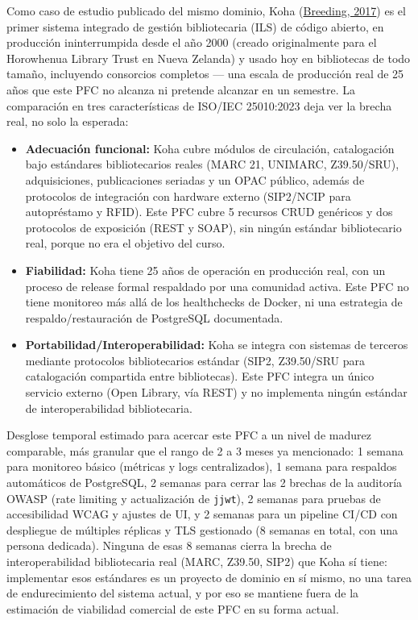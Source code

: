 \documentclass[12pt,a4paper]{article}
\begin{document}
Como caso de estudio publicado del mismo dominio, Koha (\hyperlink{ref:breeding}{Breeding, 2017}) es el
primer sistema integrado de gestión bibliotecaria (ILS) de código abierto, en producción
ininterrumpida desde el año 2000 (creado originalmente para el Horowhenua Library Trust
en Nueva Zelanda) y usado hoy en bibliotecas de todo tamaño, incluyendo consorcios
completos — una escala de producción real de 25 años que este PFC no alcanza ni pretende
alcanzar en un semestre. La comparación en tres características de ISO/IEC 25010:2023
deja ver la brecha real, no solo la esperada:

\begin{itemize}[itemsep=2pt]
  \item \textbf{Adecuación funcional:} Koha cubre módulos de circulación, catalogación
  bajo estándares bibliotecarios reales (MARC 21, UNIMARC, Z39.50/SRU), adquisiciones,
  publicaciones seriadas y un OPAC público, además de protocolos de integración con
  hardware externo (SIP2/NCIP para autopréstamo y RFID). Este PFC cubre 5 recursos CRUD
  genéricos y dos protocolos de exposición (REST y SOAP), sin ningún estándar
  bibliotecario real, porque no era el objetivo del curso.
  \item \textbf{Fiabilidad:} Koha tiene 25 años de operación en producción real, con un
  proceso de release formal respaldado por una comunidad activa. Este PFC no tiene
  monitoreo más allá de los healthchecks de Docker, ni una estrategia de
  respaldo/restauración de PostgreSQL documentada.
  \item \textbf{Portabilidad/Interoperabilidad:} Koha se integra con sistemas de terceros
  mediante protocolos bibliotecarios estándar (SIP2, Z39.50/SRU para catalogación
  compartida entre bibliotecas). Este PFC integra un único servicio externo (Open
  Library, vía REST) y no implementa ningún estándar de interoperabilidad bibliotecaria.
\end{itemize}

Desglose temporal estimado para acercar este PFC a un nivel de madurez comparable, más
granular que el rango de 2 a 3 meses ya mencionado: 1 semana para monitoreo básico
(métricas y logs centralizados), 1 semana para respaldos automáticos de PostgreSQL, 2
semanas para cerrar las 2 brechas de la auditoría OWASP (rate limiting y actualización de
\texttt{jjwt}), 2 semanas para pruebas de accesibilidad WCAG y ajustes de UI, y 2 semanas
para un pipeline CI/CD con despliegue de múltiples réplicas y TLS gestionado (8 semanas
en total, con una persona dedicada). Ninguna de esas 8 semanas cierra la brecha de
interoperabilidad bibliotecaria real (MARC, Z39.50, SIP2) que Koha sí tiene: implementar
esos estándares es un proyecto de dominio en sí mismo, no una tarea de endurecimiento del
sistema actual, y por eso se mantiene fuera de la estimación de viabilidad comercial de
este PFC en su forma actual.
\end{document}
